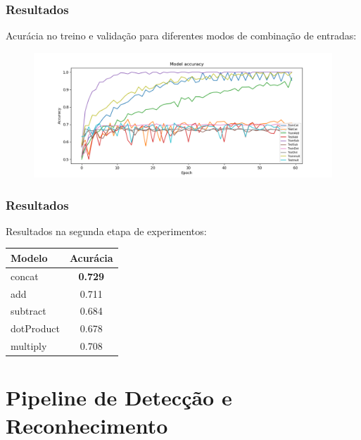 \documentclass{beamer}
\begin{document}

\begin{frame}
\frametitle{Resultados}
    Acurácia no treino e validação para diferentes modos de combinação de entradas:
    
    \begin{figure}
    \includegraphics[width=\linewidth]{figs/curve_merge.png}
    \end{figure}
\end{frame}


\begin{frame}
\frametitle{Resultados}
    Resultados na segunda etapa de experimentos:
    \begin{table}[htb]
    \small
    \centering
    \begin{tabular}{|l|c|}
        \hline
        Modelo & Acurácia \\
        \hline
        concat & \textbf{0.729} \\
        add & 0.711 \\
        subtract & 0.684 \\
        dotProduct & 0.678 \\
        multiply & 0.708 \\
        \hline

    \end{tabular}
\end{table}

\end{frame}

\section{Pipeline de Detecção e Reconhecimento}
\end{document}
